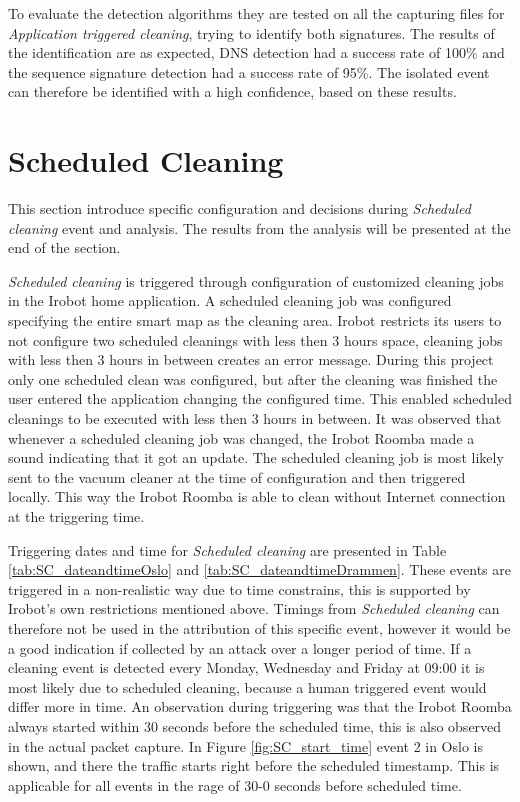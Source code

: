 To evaluate the detection algorithms they are tested on all the capturing files for \textit{Application triggered cleaning}, trying to identify both signatures. The results of the identification are as expected,  \gls{DNS} detection had a success rate of 100\% and the sequence signature detection had a success rate of 95\%. The isolated event can therefore be identified with a high confidence, based on these results. 

\section{Scheduled Cleaning}
This section introduce specific configuration and decisions during \textit{Scheduled cleaning} event and analysis. The results from the analysis will be presented at the end of the section.

\textit{Scheduled cleaning} is triggered through configuration of customized cleaning jobs in the Irobot home application. A scheduled cleaning job was configured specifying the entire smart map as the cleaning area. Irobot restricts its users to not configure two scheduled cleanings with less then 3 hours space, cleaning jobs with less then 3 hours in between creates an error message. During this project only one scheduled clean was configured, but after the cleaning was finished the user entered the application changing the configured time. This enabled scheduled cleanings to be executed with less then 3 hours in between. It was observed that whenever a scheduled cleaning job was changed, the Irobot Roomba made a sound indicating that it got an update. The scheduled cleaning job is most likely sent to the vacuum cleaner at the time of configuration and then triggered locally. This way the Irobot Roomba is able to clean without Internet connection at the triggering time. 

Triggering dates and time for \textit{Scheduled cleaning} are presented in Table \ref{tab:SC_dateandtimeOslo} and \ref{tab:SC_dateandtimeDrammen}. These events are triggered in a non-realistic way due to time constrains, this is supported by Irobot's own restrictions mentioned above. Timings from \textit{Scheduled cleaning} can therefore not be used in the attribution of this specific event, however it would be a good indication if collected by an attack over a longer period of time. If a cleaning event is detected every Monday, Wednesday and Friday at 09:00 it is most likely due to scheduled cleaning, because a human triggered event would differ more in time. An observation during triggering was that the Irobot Roomba always started within 30 seconds before the scheduled time, this is also observed in the actual packet capture. In Figure \ref{fig:SC_start_time} event 2 in Oslo is shown, and there the traffic starts right before the scheduled timestamp. This is applicable for all events in the rage of 30-0 seconds before scheduled time. 

